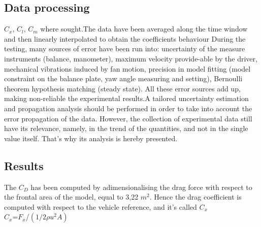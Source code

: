 \documentclass{elbioimp2}
\begin{document}
\subsection{Data processing}
$C_x$, $C_l$, $C_m$ where sought.The data have been averaged along the time window and then linearly interpolated to obtain the coefficients behaviour
 During the testing, many sources of error have been run into: uncertainty of the measure instruments (balance, manometer), maximum velocity provide-able by the driver, mechanical vibrations induced by fan motion, precision in model fitting (model constraint on the balance plate, yaw angle measuring and setting), Bernoulli theorem hypothesis matching (steady state). All these error sources add up, making non-reliable the experimental results.A tailored uncertainty estimation and propagation analysis should be performed in order to take into account the error propagation of the data. 
However, the collection of experimental data still have its relevance, namely, in the trend of the quantities, and not in the single value itself. That's why its analysis is hereby presented.
\subsection{Results}
The $C_D$ has been computed by adimensionalising the drag force with respect to the frontal area of the model, equal to 3,22 $m^2$. Hence the drag coefficient is computed with respect to the vehicle reference, and it's called $C_x$ \\
$C_x$=$F_x$/$(1/2 ρu^2 A)$ 
\end{document}
